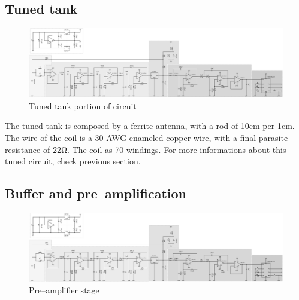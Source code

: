 \subsection{Tuned tank}
\begin{figure}[h]
	\centering
	\includegraphics*[viewport=3 3 240 457,scale=0.4]{ch2/img/receiver3.pdf}
	\caption{Tuned tank portion of circuit}
	\label{fig:tunedtank}
\end{figure}

The tuned tank is composed by a ferrite antenna, with a rod of \num{10}\si{\centi\meter} per \diameter \num{1}\si{\centi\meter}. The wire of the coil is a \num{30} AWG enameled copper wire, with a final parasite resistance of \num{22}\si{\ohm}. The coil as \num{70} windings. For more informations about this tuned circuit, check previous section.

\subsection{Buffer and pre--amplification}
\begin{figure}[h]
	\centering
	\includegraphics*[viewport=170 3 1250 380,scale=0.4]{ch2/img/receiver3.pdf}
	\caption{Pre--amplifier stage}
	\label{fig:filter1}
\end{figure}

